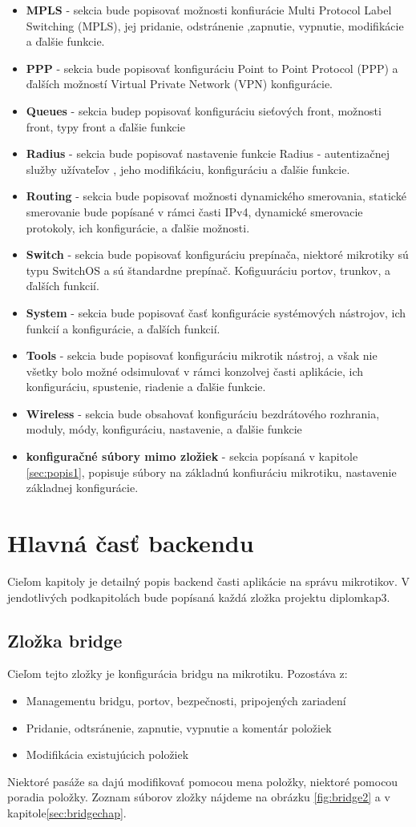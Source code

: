 \begin{itemize}
\item \textbf{MPLS} - sekcia bude popisovať možnosti konfiurácie Multi Protocol Label Switching (MPLS), jej pridanie, odstránenie ,zapnutie, vypnutie, modifikácie a ďalšie funkcie.
\item \textbf{PPP} - sekcia bude popisovať konfiguráciu Point to Point Protocol (PPP) a ďalších možností Virtual Private Network (VPN) konfigurácie.
\item \textbf{Queues} - sekcia budep popisovať konfiguráciu sieťových front, možnosti front, typy front a ďalšie funkcie
\item \textbf{Radius} - sekcia bude popisovať nastavenie funkcie Radius - autentizačnej služby užívateľov , jeho modifikáciu, konfiguráciu a ďalšie funkcie.
\item \textbf{Routing} - sekcia bude popisovať možnosti dynamického smerovania, statické smerovanie bude popísané v rámci časti IPv4, dynamické smerovacie protokoly, ich konfigurácie, a ďalšie možnosti. 
\item \textbf{Switch} - sekcia bude popisovať konfiguráciu prepínača, niektoré mikrotiky sú typu SwitchOS a sú štandardne prepínač. Kofiguuráciu portov, trunkov, a ďalších funkcií. 
\item \textbf{System} - sekcia bude popisovať časť konfigurácie systémových nástrojov, ich funkcií a konfigurácie, a ďalších funkcií.
\item \textbf{Tools} - sekcia bude popisovať konfiguráciu mikrotik nástroj, a však nie všetky bolo možné odsimulovať v rámci konzolvej časti aplikácie, ich konfiguráciu, spustenie, riadenie a ďalšie funkcie. 
\item \textbf{Wireless} - sekcia bude obsahovať konfiguráciu bezdrátového rozhrania, moduly, módy, konfiguráciu, nastavenie, a ďalšie funkcie
\item \textbf{konfiguračné súbory mimo zložiek} - sekcia popísaná v kapitole  \ref{sec:popis1}, popisuje súbory na základnú konfiuráciu mikrotiku, nastavenie základnej konfigurácie.
\end{itemize}
\chapter{Hlavná časť backendu}
Cieľom kapitoly je detailný popis backend časti aplikácie na správu mikrotikov. V jendotlivých podkapitolách bude popísaná každá zložka projektu diplomkap3.
\section{Zložka bridge}
Cieľom tejto zložky je konfigurácia bridgu na mikrotiku. Pozostáva z:\begin{itemize}
\item Managementu bridgu, portov, bezpečnosti, pripojených zariadení
\item Pridanie, odtsránenie, zapnutie, vypnutie a komentár položiek
\item Modifikácia existujúcich položiek
\end{itemize} 
Niektoré pasáže sa dajú modifikovať pomocou mena položky, niektoré pomocou poradia položky. Zoznam súborov  zložky nájdeme na obrázku \ref{fig:bridge2} a v kapitole\ref{sec:bridgechap}. 
